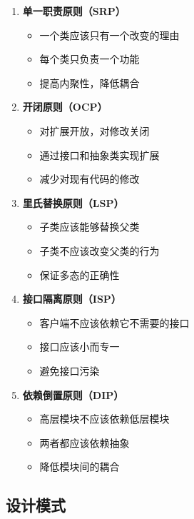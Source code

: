 \begin{enumerate}
  \item \textbf{单一职责原则（SRP）}
    \begin{itemize}
      \item 一个类应该只有一个改变的理由
      \item 每个类只负责一个功能
      \item 提高内聚性，降低耦合
    \end{itemize}

  \item \textbf{开闭原则（OCP）}
    \begin{itemize}
      \item 对扩展开放，对修改关闭
      \item 通过接口和抽象类实现扩展
      \item 减少对现有代码的修改
    \end{itemize}

  \item \textbf{里氏替换原则（LSP）}
    \begin{itemize}
      \item 子类应该能够替换父类
      \item 子类不应该改变父类的行为
      \item 保证多态的正确性
    \end{itemize}

  \item \textbf{接口隔离原则（ISP）}
    \begin{itemize}
      \item 客户端不应该依赖它不需要的接口
      \item 接口应该小而专一
      \item 避免接口污染
    \end{itemize}

  \item \textbf{依赖倒置原则（DIP）}
    \begin{itemize}
      \item 高层模块不应该依赖低层模块
      \item 两者都应该依赖抽象
      \item 降低模块间的耦合
    \end{itemize}
\end{enumerate}

\subsection{设计模式}

